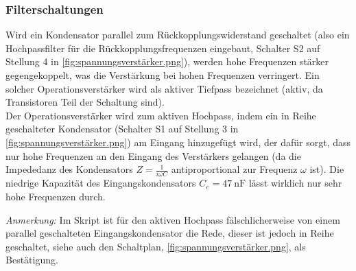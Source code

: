 \subsubsection{Filterschaltungen}
Wird ein Kondensator parallel zum Rückkopplungswiderstand geschaltet (also ein Hochpassfilter für die Rückkopplungsfrequenzen eingebaut, Schalter S2 auf Stellung 4 in \cref{fig:spannungsverstärker.png}), werden hohe
Frequenzen stärker gegengekoppelt, was die Verstärkung bei hohen Frequenzen verringert. Ein solcher Operationsverstärker wird als aktiver Tiefpass bezeichnet (aktiv, da Transistoren Teil der Schaltung sind).\\
Der Operationsverstärker wird zum aktiven Hochpass, indem ein in Reihe geschalteter Kondensator (Schalter S1 auf Stellung 3 in \cref{fig:spannungsverstärker.png}) am Eingang hinzugefügt wird, der dafür sorgt, dass nur hohe Frequenzen an den Eingang des Verstärkers gelangen (da die Impededanz des Kondensators \(Z=\frac{1}{i\omega C}\) antiproportional zur Frequenz \(\omega\) ist). Die niedrige Kapazität des Eingangskondensators \(C_e=\qty{47}{\nano\farad}\) lässt wirklich nur sehr hohe Frequenzen durch.

\emph{Anmerkung:} Im Skript ist für den aktiven Hochpass fälschlicherweise von einem parallel geschalteten Eingangskondensator die Rede, dieser ist jedoch in Reihe geschaltet, siehe auch den Schaltplan, \cref{fig:spannungsverstärker.png}, als Bestätigung.



